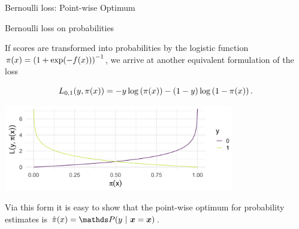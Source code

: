 \begin{vbframe}{Bernoulli loss: Point-wise Optimum}




\end{vbframe}

\begin{vbframe}{Bernoulli loss on probabilities}

If scores are transformed into probabilities by the logistic function  $\pi(x) = \left(1 + \exp(- f(x))\right)^{-1}$, we arrive at another equivalent formulation of the loss

  $$
    L_{0,1}(y, \pi(x)) = - y \log \left(\pi(x)\right) - (1 - y) \log \left(1 - \pi(x)\right). 
  $$

\begin{center}
\includegraphics[width = 10cm ]{figure_man/bernoulli-loss.png} \\
\end{center}

Via this form it is easy to show that the point-wise optimum for probability estimates is $\pixh = \P(y~|~\xv = \xv)$.

\end{vbframe}

